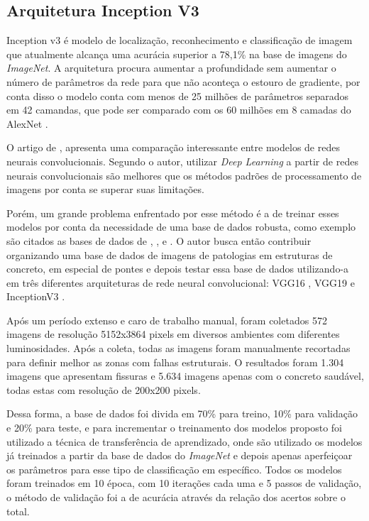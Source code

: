\subsection{Arquitetura Inception V3}

Inception v3 \cite{szegedy2015going} é modelo de localização, reconhecimento e classificação de imagem que atualmente alcança uma acurácia superior a 78,1\% na base de imagens do \textit{ImageNet}. A arquitetura procura aumentar a profundidade sem aumentar o número de parâmetros da rede para que não aconteça o estouro de gradiente, por conta disso o modelo conta com menos de 25 milhões de parâmetros separados em 42 camandas, que pode ser comparado com os 60 milhões em 8 camadas do AlexNet \cite{alexnetAnalyticsVidhya2021}.


O artigo de , apresenta uma comparação interessante entre modelos de redes neurais convolucionais. Segundo o autor, utilizar \textit{Deep Learning} a partir de redes neurais convolucionais são melhores que os métodos padrões de processamento de imagens por conta se superar suas limitações. %

Porém, um grande problema enfrentado por esse método é a de treinar esses modelos por conta da necessidade de uma base de dados robusta, como exemplo são citados as bases de dados de , ,  e .
O autor busca então contribuir organizando uma base de dados de imagens de patologias em estruturas de concreto, em especial de pontes e depois testar essa base de dados utilizando-a em três diferentes arquiteturas de rede neural convolucional: VGG16 \cite{simonyan2014very}, VGG19 \cite{simonyan2014very} e InceptionV3 \cite{szegedy2015going}.

Após um período extenso e caro de trabalho manual, foram coletados 572 imagens de resolução 5152x3864 pixels em diversos ambientes com diferentes luminosidades. 
Após a coleta, todas as imagens foram manualmente recortadas para definir melhor as zonas com falhas estruturais. O resultados foram 1.304 imagens que apresentam fissuras e 5.634 imagens apenas com o concreto saudável, todas estas com resolução de 200x200 pixels.

Dessa forma, a base de dados foi divida em 70\% para treino, 10\% para validação e 20\% para teste, e para incrementar o treinamento dos modelos proposto foi utilizado a técnica de transferência de aprendizado, onde são utilizado os modelos já treinados a partir da base de dados do \textit{ImageNet} \cite{deng2009imagenet} e depois apenas aperfeiçoar os parâmetros para esse tipo de classificação em específico.
Todos os modelos foram treinados em 10 época, com 10 iterações cada uma e 5 passos de validação, o método de validação foi a de acurácia através da relação dos acertos sobre o total.

